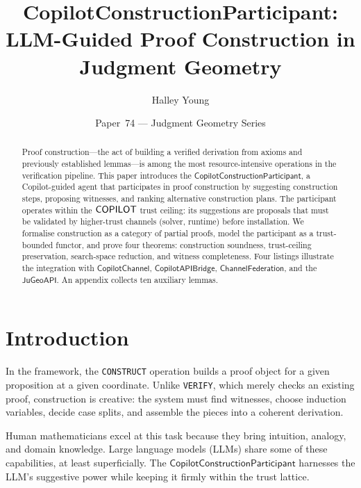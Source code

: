 \documentclass[11pt]{article}
\title{\textbf{CopilotConstructionParticipant:\\
LLM-Guided Proof Construction in Judgment Geometry}}
\author{Halley Young}
\date{Paper~74 --- Judgment Geometry Series}
\newcommand{\CCP}{\mathsf{CopilotConstructionParticipant}}
\newcommand{\CopChan}{\mathsf{CopilotChannel}}
\newcommand{\CopBridge}{\mathsf{CopilotAPIBridge}}
\newcommand{\ChanFed}{\mathsf{ChannelFederation}}
\begin{document}
\maketitle

\begin{abstract}
Proof construction---the act of building a verified derivation
from axioms and previously established lemmas---is among the
most resource-intensive operations in the \JuGeo{} verification
pipeline.  This paper introduces the $\CCP$, a Copilot-guided
agent that participates in proof construction by suggesting
construction steps, proposing witnesses, and ranking alternative
construction plans.  The participant operates within the
$\mathsf{COPILOT}$ trust ceiling: its suggestions are proposals
that must be validated by higher-trust channels (solver, runtime)
before installation.  We formalise construction as a category
of partial proofs, model the participant as a trust-bounded
functor, and prove four theorems: construction soundness,
trust-ceiling preservation, search-space reduction, and
witness completeness.  Four \Python{} listings illustrate
the integration with $\CopChan$, $\CopBridge$, $\ChanFed$,
and the $\mathsf{JuGeoAPI}$.  An appendix collects ten
auxiliary lemmas.
\end{abstract}

\section{Introduction}\label{sec:intro}

In the \JuGeo{} framework, the \texttt{CONSTRUCT} operation
builds a proof object for a given proposition at a given
coordinate.  Unlike \texttt{VERIFY}, which merely checks
an existing proof, construction is creative: the system must
find witnesses, choose induction variables, decide case
splits, and assemble the pieces into a coherent derivation.

Human mathematicians excel at this task because they bring
intuition, analogy, and domain knowledge.  Large language
models (LLMs) share some of these capabilities, at least
superficially.  The $\CCP$ harnesses the LLM's suggestive
power while keeping it firmly within the trust lattice.
\end{document}
